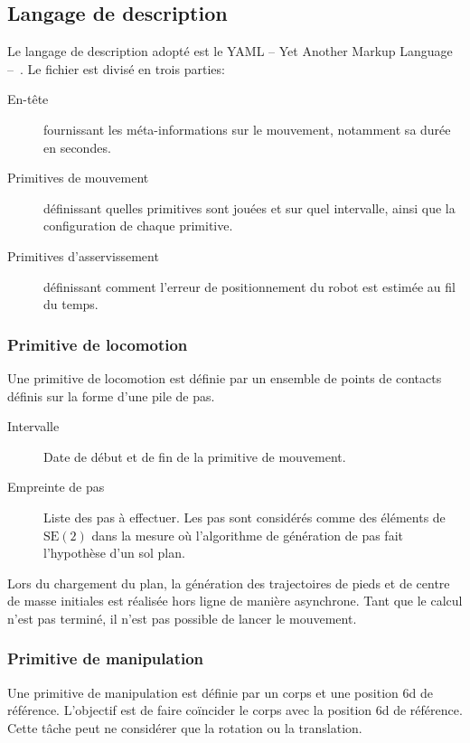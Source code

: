 \subsection{Langage de description}

Le langage de description adopté est le YAML -- Yet Another Markup
Language -- \citep{yaml}. Le
fichier est divisé en trois parties:
\begin{description}
\item[En-tête] fournissant les méta-informations sur le mouvement,
  notamment sa durée en secondes.
\item[Primitives de mouvement] définissant quelles primitives sont
  jouées et sur quel intervalle, ainsi que la configuration de chaque
  primitive.
\item[Primitives d'asservissement] définissant comment l'erreur de
  positionnement du robot est estimée au fil du temps.
\end{description}


\subsubsection{Primitive de locomotion}

Une primitive de locomotion est définie par un ensemble de points de
contacts définis sur la forme d'une pile de pas.

\begin{description}
\item[Intervalle] Date de début et de fin de la primitive de mouvement.
\item[Empreinte de pas] Liste des pas à effectuer. Les pas sont
  considérés comme des éléments de $\text{SE}(2)$ dans la mesure où
  l'algorithme de génération de pas fait l'hypothèse d'un sol plan.
\end{description}

Lors du chargement du plan, la génération des trajectoires de pieds et
de centre de masse initiales est réalisée hors ligne de manière
asynchrone. Tant que le calcul n'est pas terminé, il n'est pas
possible de lancer le mouvement.


\subsubsection{Primitive de manipulation}

Une primitive de manipulation est définie par un corps et une position
6d de référence. L'objectif est de faire coïncider le corps avec la
position 6d de référence. Cette tâche peut ne considérer que la
rotation ou la translation.

